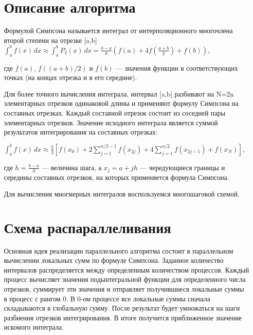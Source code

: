 \documentclass{report}
\begin{document}
\section*{Описание алгоритма}
\par 
Формулой Симпсона называется интеграл от интерполяционного многочлена второй степени на отрезке [a,b]
$\displaystyle {\int_{a}^{b} f(x) \, dx }\approx {\int_{a}^{b} P_{2}(x) \, dx}=\frac  {b-a}{6}{\left(f(a)+4f\left({\frac  {a+b}{2}}\right)+f(b)\right)}$,
\par где ${\displaystyle f(a)}$, ${\displaystyle f((a+b)/2)}$ и ${\displaystyle f(b)}$ — значения функции в соответствующих точках (на концах отрезка и в его середине).
\par Для более точного вычисления интеграла, интервал [a,b] разбивают на N=2n элементарных отрезков одинаковой длины и применяют формулу Симпсона на составных отрезках. Каждый составной отрезок состоит из соседней пары элементарных отрезков. Значение исходного интеграла является суммой результатов интегрирования на составных отрезках:

${\displaystyle \int _{a}^{b}f(x)\,dx\approx {\frac {h}{3}}\left[f(x_{0})+2\sum _{j=1}^{n/2-1}f(x_{2j})+4\sum _{j=1}^{n/2}f(x_{2j-1})+f(x_{N})\right],}$
\par где ${\displaystyle h={\frac {b-a}{N}}}$ — величина шага, а ${\displaystyle x_{j}=a+jh}$ — чередующиеся границы и середины составных отрезков, на которых применяется формула Симпсона.
 \par Для вычисления многмерных интегралов воспользуемся многошаговой схемой.
\newpage

\section*{Схема распараллеливания}
\par 
Основная идея реализации параллельного алгоритма состоит в параллельном вычислении локальных сумм по формуле Симпсона. Заданное количество интервалов распределяется между определенным количеством процессов. Каждый процесс
вычисляет значения подынтегральной функции для определенного числа отрезков, суммирует эти значения и отправляет получившиеся локальные суммы в процесс с рангом 0.
В 0-ом процессе все локальные суммы сначала складываются в глобальную сумму. После
результат будет умножаться на шаги разбиения отрезков интегрирования. В итоге получится приближенное значение искомого интеграла.
\newpage
\end{document}
